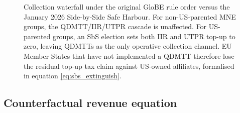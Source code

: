 \documentclass[11pt,a4paper]{article}
\begin{document}
\begin{figure}[H]
\caption[Allocation rule under the Side-by-Side Safe Harbour.]{Collection waterfall under the original GloBE rule order versus the January 2026 Side-by-Side Safe Harbour. For non-US-parented MNE groups, the QDMTT/IIR/UTPR cascade is unaffected. For US-parented groups, an SbS election sets both IIR and UTPR top-up to zero, leaving QDMTTs as the only operative collection channel. EU Member States that have not implemented a QDMTT therefore lose the residual top-up tax claim against US-owned affiliates, formalised in equation \eqref{eq:sbs_extinguish}.}
\label{fig:sbs_waterfall}
\end{figure}

\subsection{Counterfactual revenue equation}\label{sec:pipeline}
\end{document}
